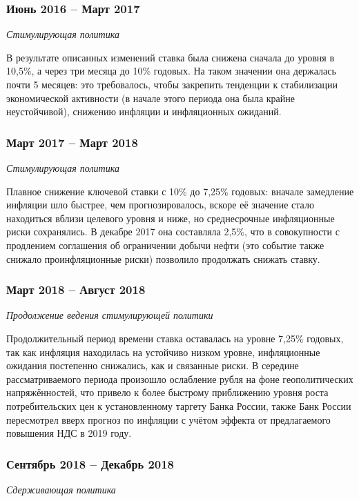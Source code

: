 \subsubsection*{Июнь 2016 – Март 2017}
\noindent
\emph{Стимулирующая политика}

\noindent
В результате описанных изменений ставка была снижена сначала до уровня в 10,5\%, а через три месяца до 10\% годовых. На таком значении она держалась почти 5 месяцев: это требовалось, чтобы закрепить тенденции к стабилизации экономической активности (в начале этого периода она была крайне неустойчивой), снижению инфляции и инфляционных ожиданий.

\subsubsection*{Март 2017 – Март 2018}
\noindent
\emph{Стимулирующая политика}

\noindent
Плавное снижение ключевой ставки с 10\% до 7,25\% годовых: вначале замедление инфляции шло быстрее, чем прогнозировалось, вскоре её значение стало находиться вблизи целевого уровня и ниже, но среднесрочные инфляционные риски сохранялись. В декабре 2017 она составляла 2,5\%, что в совокупности с продлением соглашения об ограничении добычи нефти (это событие также снижало проинфляционные риски) позволило продолжать снижать ставку.

\subsubsection*{Март 2018 – Август 2018}
\noindent
\emph{Продолжение ведения стимулирующей политики}

\noindent
Продолжительный период времени ставка оставалась на уровне 7,25\% годовых, так как инфляция находилась на устойчиво низком уровне, инфляционные ожидания постепенно снижались, как и связанные риски. В середине рассматриваемого периода произошло ослабление рубля на фоне геополитических напряжённостей, что привело к более быстрому приближению уровня роста потребительских цен к установленному таргету Банка России, также Банк России пересмотрел вверх прогноз по инфляции с учётом эффекта от предлагаемого повышения НДС в 2019 году.

\subsubsection*{Сентябрь 2018 – Декабрь 2018}
\noindent
\emph{Сдерживающая политика}


